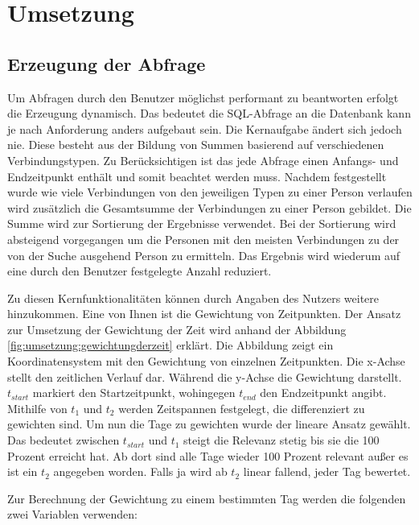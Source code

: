 
\chapter{Umsetzung}

\section{Erzeugung der Abfrage}

Um Abfragen durch den Benutzer möglichst performant zu beantworten erfolgt die Erzeugung dynamisch. Das bedeutet die SQL-Abfrage an die Datenbank kann je nach Anforderung anders aufgebaut sein. Die Kernaufgabe ändert sich jedoch nie. Diese besteht aus der Bildung von Summen basierend auf verschiedenen Verbindungstypen. Zu Berücksichtigen ist das jede Abfrage einen Anfangs- und Endzeitpunkt enthält und somit beachtet werden muss. Nachdem festgestellt wurde wie viele Verbindungen von den jeweiligen Typen zu einer Person verlaufen wird zusätzlich die Gesamtsumme der Verbindungen zu einer Person gebildet. Die Summe wird zur Sortierung der Ergebnisse verwendet. Bei der Sortierung wird absteigend vorgegangen um die Personen mit den meisten Verbindungen zu der von der Suche ausgehend Person zu ermitteln. Das Ergebnis wird wiederum auf eine durch den Benutzer festgelegte Anzahl reduziert. 

Zu diesen Kernfunktionalitäten können durch Angaben des Nutzers weitere hinzukommen. Eine von Ihnen ist die Gewichtung von Zeitpunkten. Der Ansatz zur Umsetzung der Gewichtung der Zeit wird anhand der Abbildung \ref{fig:umsetzung:gewichtungderzeit} erklärt. Die Abbildung zeigt ein Koordinatensystem mit den Gewichtung von einzelnen Zeitpunkten. Die x-Achse stellt den zeitlichen Verlauf dar. Während die y-Achse die Gewichtung darstellt. $t_{start}$ markiert den Startzeitpunkt, wohingegen $t_{end}$ den Endzeitpunkt angibt. Mithilfe von $t_1$ und $t_2$ werden Zeitspannen festgelegt, die differenziert zu gewichten sind. Um nun die Tage zu gewichten wurde der lineare Ansatz gewählt. Das bedeutet zwischen $t_{start}$ und $t_1$ steigt die Relevanz stetig bis sie die 100 Prozent erreicht hat. Ab dort sind alle Tage wieder 100 Prozent relevant außer es ist ein $t_2$ angegeben worden. Falls ja wird ab $t_2$ linear fallend, jeder Tag bewertet. 

Zur Berechnung der Gewichtung zu einem bestimmten Tag werden die folgenden zwei Variablen verwenden:

